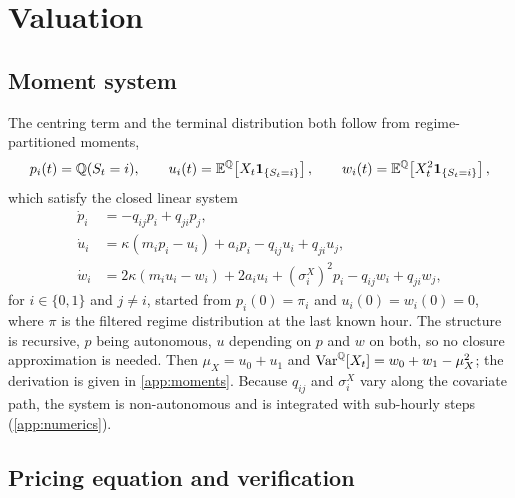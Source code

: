 \section{Valuation}
\label{sec:valuation}

\subsection{Moment system}
\label{sec:moments}

The centring term and the terminal distribution both follow from
regime-partitioned moments,
\begin{equation}
  p_i(t)=\mathbb{Q}(S_t=i),\qquad
  u_i(t)=\mathbb{E}^{\mathbb{Q}}\!\left[X_t\mathbf{1}_{\{S_t=i\}}\right],\qquad
  w_i(t)=\mathbb{E}^{\mathbb{Q}}\!\left[X_t^{2}\mathbf{1}_{\{S_t=i\}}\right],
\end{equation}
which satisfy the closed linear system
\begin{equation}
\begin{aligned}
  \dot p_i &= -q_{ij}p_i + q_{ji}p_j,\\
  \dot u_i &= \kappa\left(m_i p_i - u_i\right) + a_i p_i
              - q_{ij}u_i + q_{ji}u_j,\\
  \dot w_i &= 2\kappa\left(m_i u_i - w_i\right) + 2a_i u_i
              + \left(\sigma^X_i\right)^2 p_i - q_{ij}w_i + q_{ji}w_j,
\end{aligned}
\label{eq:momentsys}
\end{equation}
for $i\in\{0,1\}$ and $j\neq i$, started from $p_i(0)=\pi_i$ and
$u_i(0)=w_i(0)=0$, where $\pi$ is the filtered regime distribution at the last
known hour. The structure is recursive, $p$ being autonomous, $u$ depending on
$p$ and $w$ on both, so no closure approximation is needed. Then
$\mu_X=u_0+u_1$ and $\operatorname{Var}^{\mathbb{Q}}[X_t]=w_0+w_1-\mu_X^2$; the
derivation is given in \ref{app:moments}. Because $q_{ij}$ and
$\sigma^X_i$ vary along the covariate path, the system is non-autonomous and is
integrated with sub-hourly steps (\ref{app:numerics}).

\subsection{Pricing equation and verification}

